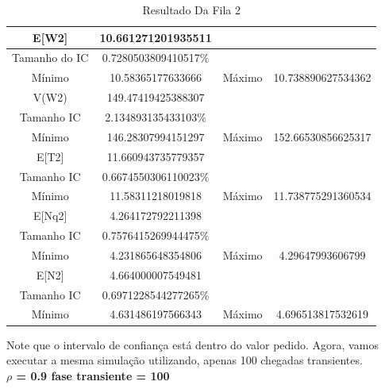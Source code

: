 \documentclass[a4paper,10pt]{article}
\begin{document}
	    \begin{table}[H] 
		  \centering
		  \begin{tabular}{|c|c|c|c|}
		        \hline
			 E[W2]         & 10.661271201935511     &        &                        \\ \hline
			 Tamanho do IC & 0.7280503809410517$\%$ & 	 &		         \\ \hline
			 Mínimo        & 10.58365177633666      & Máximo & 10.738890627534362     \\ \hline
			 V(W2)         & 149.47419425388307     &	 &		         \\ \hline	
			 Tamanho IC    & 2.134893135433103$\%$  &	 &		         \\ \hline
			 Mínimo        & 146.28307994151297     & Máximo & 152.66530856625317	 \\ \hline
			 E[T2]         & 11.660943735779357     &	 &		         \\ \hline	
			 Tamanho IC    & 0.6674550306110023$\%$ &	 &		         \\ \hline
			 Mínimo        & 11.58311218019818      & Máximo & 11.738775291360534	 \\ \hline
			 E[Nq2]        & 4.264172792211398      &	 &		         \\ \hline	
			 Tamanho IC    & 0.7576415269944475$\%$ &	 &		         \\ \hline
			 Mínimo        & 4.231865648354806      & Máximo & 4.29647993606799	 \\ \hline
			 E[N2]         & 4.664000007549481      &	 &		         \\ \hline	
			 Tamanho IC    & 0.6971228544277265$\%$ &	 &		         \\ \hline
			 Mínimo        & 4.631486197566343      & Máximo & 4.696513817532619	 \\ \hline
		  \end{tabular}
		  \caption{Resultado Da Fila 2} 
	    \end{table}
	    Note que o intervalo de confiança está dentro do valor pedido. Agora, vamos executar a mesma simulação utilizando, apenas 100 chegadas transientes.
	    \textbf{\\$\rho$ = 0.9 fase transiente = 100}
\end{document}

